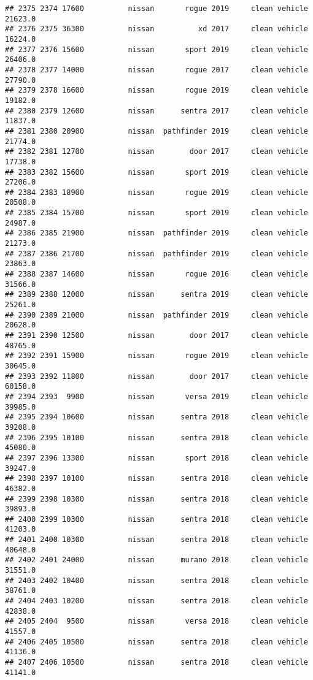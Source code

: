 \documentclass[
]{article}
\begin{document}
\begin{verbatim}
## 2375 2374 17600          nissan       rogue 2019     clean vehicle   21623.0
## 2376 2375 36300          nissan          xd 2017     clean vehicle   16224.0
## 2377 2376 15600          nissan       sport 2019     clean vehicle   26406.0
## 2378 2377 14000          nissan       rogue 2017     clean vehicle   27790.0
## 2379 2378 16600          nissan       rogue 2019     clean vehicle   19182.0
## 2380 2379 12600          nissan      sentra 2017     clean vehicle   11837.0
## 2381 2380 20900          nissan  pathfinder 2019     clean vehicle   21774.0
## 2382 2381 12700          nissan        door 2017     clean vehicle   17738.0
## 2383 2382 15600          nissan       sport 2019     clean vehicle   27206.0
## 2384 2383 18900          nissan       rogue 2019     clean vehicle   20508.0
## 2385 2384 15700          nissan       sport 2019     clean vehicle   24987.0
## 2386 2385 21900          nissan  pathfinder 2019     clean vehicle   21273.0
## 2387 2386 21700          nissan  pathfinder 2019     clean vehicle   23863.0
## 2388 2387 14600          nissan       rogue 2016     clean vehicle   31566.0
## 2389 2388 12000          nissan      sentra 2019     clean vehicle   25261.0
## 2390 2389 21000          nissan  pathfinder 2019     clean vehicle   20628.0
## 2391 2390 12500          nissan        door 2017     clean vehicle   48765.0
## 2392 2391 15900          nissan       rogue 2019     clean vehicle   30645.0
## 2393 2392 11800          nissan        door 2017     clean vehicle   60158.0
## 2394 2393  9900          nissan       versa 2019     clean vehicle   39985.0
## 2395 2394 10600          nissan      sentra 2018     clean vehicle   39208.0
## 2396 2395 10100          nissan      sentra 2018     clean vehicle   45080.0
## 2397 2396 13300          nissan       sport 2018     clean vehicle   39247.0
## 2398 2397 10100          nissan      sentra 2018     clean vehicle   46382.0
## 2399 2398 10300          nissan      sentra 2018     clean vehicle   39893.0
## 2400 2399 10300          nissan      sentra 2018     clean vehicle   41203.0
## 2401 2400 10300          nissan      sentra 2018     clean vehicle   40648.0
## 2402 2401 24000          nissan      murano 2018     clean vehicle   31551.0
## 2403 2402 10400          nissan      sentra 2018     clean vehicle   38761.0
## 2404 2403 10200          nissan      sentra 2018     clean vehicle   42838.0
## 2405 2404  9500          nissan       versa 2018     clean vehicle   41557.0
## 2406 2405 10500          nissan      sentra 2018     clean vehicle   41136.0
## 2407 2406 10500          nissan      sentra 2018     clean vehicle   41141.0

\end{verbatim}
\end{document}
